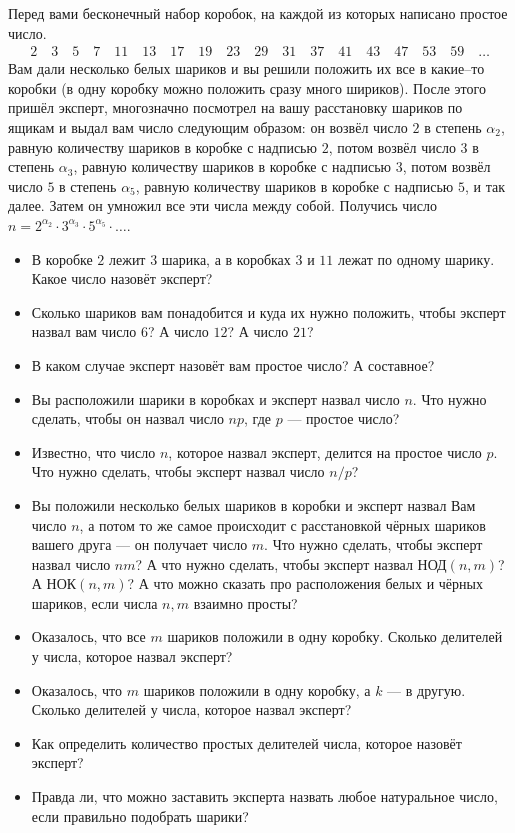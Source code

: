 \documentclass[10pt]{scrbook} \usepackage{modules/nonstahp_book}
\begin{document}

Перед вами бесконечный набор коробок, на каждой из которых написано простое число. 
\begin{align*}
2 \quad 3 \quad 5 \quad 7 \quad 11 \quad 13 \quad 17 \quad 19 \quad 23 \quad 29 \quad 31 \quad 37 \quad 41 \quad 43 \quad 47 \quad 53 \quad 59 \quad \ldots
\end{align*}
Вам дали несколько белых шариков и вы решили положить их все в какие--то коробки (в одну коробку можно положить сразу много шириков). 
После этого пришёл эксперт, многозначно посмотрел на вашу расстановку шариков по ящикам и выдал вам число следующим образом: он возвёл число $2$ в степень $\alpha_2$, равную количеству шариков в коробке с надписью $2$, потом возвёл число $3$ в степень $\alpha_3$, равную количеству шариков в коробке с надписью $3$, потом возвёл число $5$ в степень $\alpha_5$, равную количеству шариков в коробке с надписью $5$, и так далее. Затем он умножил все эти числа между собой. Получись число $n = 2^{\alpha_2}\cdot 3^{\alpha_3}\cdot 5^{\alpha_5}\cdot \ldots$.
\begin{itemize}
\item В коробке $2$ лежит $3$ шарика, а в коробках $3$ и $11$ лежат по одному шарику. Какое число назовёт эксперт?
\item Сколько шариков вам понадобится и куда их нужно положить, чтобы эксперт назвал вам число $6$? А число $12$? А число $21$?
\item В каком случае эксперт назовёт вам простое число? А составное? 
\item Вы расположили шарики в коробках и эксперт назвал число $n$. Что нужно сделать, чтобы он назвал число $np$, где $p$ --- простое число?
\item Известно, что число $n$, которое назвал эксперт, делится на простое число $p$. Что нужно сделать, чтобы эксперт назвал число $n/p$?
\item Вы положили несколько белых шариков в коробки и эксперт назвал Вам число $n$, а потом то же самое происходит с расстановкой чёрных шариков вашего друга --- он получает число $m$. Что нужно сделать, чтобы эксперт назвал число $nm$? А что нужно сделать, чтобы эксперт назвал НОД$(n,m)$? А НОК$(n,m)$? А что можно сказать про расположения белых и чёрных шариков, если числа $n,m$ взаимно просты?
\item Оказалось, что все $m$ шариков положили в одну коробку. Сколько делителей у числа, которое назвал эксперт?
\item Оказалось, что $m$ шариков положили в одну коробку, а $k$ --- в другую. Сколько делителей у числа, которое назвал эксперт?
\item Как определить количество простых делителей числа, которое назовёт эксперт?
\item Правда ли, что можно заставить эксперта назвать любое натуральное число, если правильно подобрать шарики?
\end{itemize}
\end{document}
